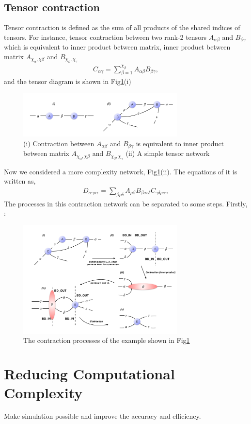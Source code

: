\subsection{Tensor contraction}
Tensor contraction is defined as the sum of all products of the shared indices of tensors. For instance, tensor contraction between two rank-2 tensors $A_{\alpha \beta}$ and $B_{\beta \gamma}$ which is equivalent to inner product between matrix, inner product between matrix $A_{\chi_{\alpha}, \chi{\beta}}$ and $B_{\chi_{\beta}, \chi_{\gamma}}$
\begin{align}
	C_{\alpha \gamma}=\sum\limits_{\beta = 1}^{\chi_{\beta}}{A_{\alpha \beta}B_{\beta \gamma}},
\end{align}
and the tensor diagram is shown in Fig\ref{fig222}(i)
	\begin{figure}[ht]
	\centering
	\includegraphics[width=0.75\textwidth]{figures/fig222.png}
	\caption[Simple examples of tensor diagrams.]{(i) Contraction between $A_{\alpha \beta}$ and $B_{\beta \gamma}$ is equivalent to inner product between matrix $A_{\chi_{\alpha}, \chi{\beta}}$ and $B_{\chi_{\beta}, \chi_{\gamma}}$ (ii) A simple tensor network}
	\label{fig222}
	\end{figure}
	Now we considered a more complexity network, Fig\ref{fig222}(ii). The equations of it is written as, 
\begin{align}
	D_{\alpha \gamma \sigma \epsilon}=\sum_{\beta \rho \delta}{A_{\rho \beta}B_{\beta \sigma \epsilon \delta}C_{\gamma \delta \rho \alpha}},
\end{align}
The processes in this contraction network can be separated to some steps.
Firstly, : 
	\begin{figure}[ht]
	\centering
	\includegraphics[width=0.75\textwidth]{figures/fig223.png}
	\caption[The contraction processes of the example network which shown in Fig\ref{fig222}(b)]{ The contraction processes of the example shown in Fig\ref{fig222}}
	\label{fig223}
	\end{figure}
\section{Reducing Computational Complexity} %
\label{sub:reduce}

Make simulation possible and improve the accuracy and efficiency.
